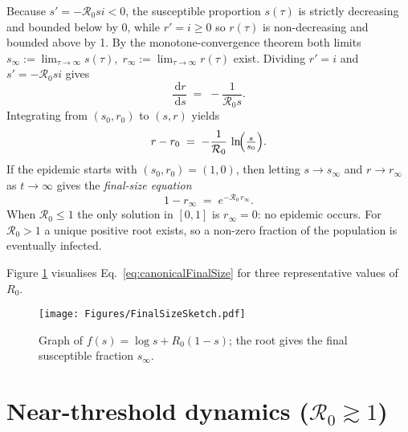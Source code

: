 \documentclass[11pt]{article}
\newcommand{\dd}{\,\mathrm{d}}
\newcommand{\RR}{\mathcal{R}_0}
\begin{document}
Because \(s'=-\RR s i<0\), the susceptible proportion \(s(\tau)\)
is strictly decreasing and bounded below by 0, while
\(r' = i \ge 0\) so \(r(\tau)\) is non-decreasing and bounded above
by 1.  By the monotone-convergence theorem both limits
\(
s_\infty := \lim_{\tau\to\infty}s(\tau),\;
r_\infty := \lim_{\tau\to\infty}r(\tau)
\)
exist.
Dividing $r'=i$ and $s'=-\RR si$ gives
\[
\frac{\dd r}{\dd s} \;=\; -\frac{1}{\RR s}.
\]
Integrating from $(s_0,r_0)$ to $(s,r)$ yields
\begin{equation}\label{eq:generalFinalSize}
  r - r_0 \;=\; -\frac{1}{\RR}\,\ln\!\Bigl(\tfrac{s}{s_0}\Bigr).
\end{equation}
If the epidemic starts with $(s_0,r_0)=(1,0)$, then letting
$s\to s_\infty$ and $r\to r_\infty$ as $t\to\infty$ gives the
\emph{final-size equation}
\begin{equation}\label{eq:canonicalFinalSize}
  1 - r_\infty \;=\; e^{-\RR\,r_\infty}.
\end{equation}
When \(\RR\le1\) the only solution in $[0,1]$ is \(r_\infty=0\):
no epidemic occurs.  For \(\RR>1\) a unique positive root exists,
so a non-zero fraction of the population is eventually infected.

Figure \ref{fig:finalsize} visualises Eq.~\eqref{eq:canonicalFinalSize}
for three representative values of~$R_0$.

\begin{figure}[H]
  \centering
  \texttt{[image: Figures/FinalSizeSketch.pdf]}
  \caption{Graph of $f(s)=\log s + R_0(1-s)$; the root gives the final
           susceptible fraction $s_\infty$.}
  \label{fig:finalsize}
\end{figure}

\section{Near-threshold dynamics (\texorpdfstring{$\RR\gtrsim 1$}{R0≈1})}
\label{sec:NearThreshold}
\end{document}
